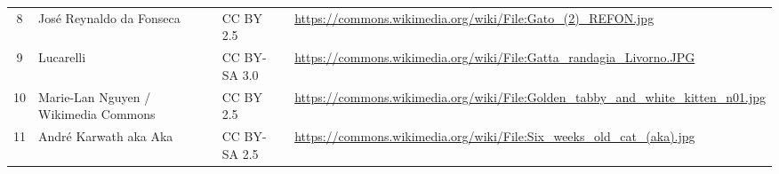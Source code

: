 \begin{table}[H]
\begin{tabularx}{\textwidth}{c >{\raggedright\arraybackslash}p{3.4cm} l >{\raggedright\arraybackslash}X}
        8 & José Reynaldo da Fonseca & CC BY 2.5 & \url{https://commons.wikimedia.org/wiki/File:Gato_(2)_REFON.jpg} \\
        9 & Lucarelli & CC BY-SA 3.0 & \url{https://commons.wikimedia.org/wiki/File:Gatta_randagia_Livorno.JPG} \\
        10 & \textcopyright{} Marie-Lan Nguyen / Wikimedia Commons & CC BY 2.5 & \url{https://commons.wikimedia.org/wiki/File:Golden_tabby_and_white_kitten_n01.jpg} \\
        11 & André Karwath aka Aka & CC BY-SA 2.5 & \url{https://commons.wikimedia.org/wiki/File:Six_weeks_old_cat_(aka).jpg} \\
        \bottomrule
    \end{tabularx}
\end{table}
